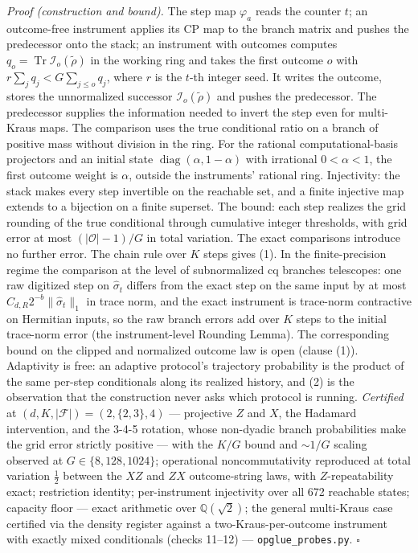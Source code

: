 \documentclass[
]{article}
\begin{document}
\emph{Proof (construction and bound).} The step map \(\varphi_a\) reads
the counter \(t\); an outcome-free instrument applies its CP map to the
branch matrix and pushes the predecessor onto the stack; an instrument
with outcomes computes
\(q_o = \operatorname{Tr} \mathcal{I}_o(\tilde\rho)\) in the working
ring and takes the first outcome \(o\) with
\(r\sum_j q_j < G\sum_{j\leq o} q_j\), where \(r\) is the \(t\)-th
integer seed. It writes the outcome, stores the unnormalized successor
\(\mathcal{I}_o(\tilde\rho)\) and pushes the predecessor. The
predecessor supplies the information needed to invert the step even for
multi-Kraus maps. The comparison uses the true conditional ratio on a
branch of positive mass without division in the ring. For the rational
computational-basis projectors and an initial state
\(\operatorname{diag}(\alpha,1-\alpha)\) with irrational \(0<\alpha<1\),
the first outcome weight is \(\alpha\), outside the instruments'
rational ring. Injectivity: the stack makes every step invertible on the
reachable set, and a finite injective map extends to a bijection on a
finite superset. The bound: each step realizes the grid rounding of the
true conditional through cumulative integer thresholds, with grid error
at most \((|\mathcal{O}|{-}1)/G\) in total variation. The exact
comparisons introduce no further error. The chain rule over \(K\) steps
gives (1). In the finite-precision regime the comparison at the level of
subnormalized cq branches telescopes: one raw digitized step on
\(\widehat\sigma_t\) differs from the exact step on the same input by at
most \(C_{d,R}2^{-b}\|\widehat\sigma_t\|_1\) in trace norm, and the
exact instrument is trace-norm contractive on Hermitian inputs, so the
raw branch errors add over \(K\) steps to the initial trace-norm error
(the instrument-level Rounding Lemma). The corresponding bound on the
clipped and normalized outcome law is open (clause (1)). Adaptivity is
free: an adaptive protocol's trajectory probability is the product of
the same per-step conditionals along its realized history, and (2) is
the observation that the construction never asks which protocol is
running. \emph{Certified} at \((d, K, |\mathcal{F}|) = (2, \{2,3\}, 4)\)
--- projective \(Z\) and \(X\), the Hadamard intervention, and the 3-4-5
rotation, whose non-dyadic branch probabilities make the grid error
strictly positive --- with the \(K/G\) bound and \(\sim 1/G\) scaling
observed at \(G \in \{8, 128, 1024\}\); operational noncommutativity
reproduced at total variation \(\tfrac12\) between the \(XZ\) and \(ZX\)
outcome-string laws, with \(Z\)-repeatability exact; restriction
identity; per-instrument injectivity over all 672 reachable states;
capacity floor --- exact arithmetic over \(\mathbb{Q}(\sqrt2)\); the
general multi-Kraus case certified via the density register against a
two-Kraus-per-outcome instrument with exactly mixed conditionals (checks
11--12) --- \texttt{opglue\_probes.py}. \(\square\)
\end{document}
